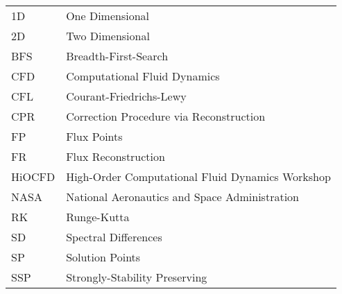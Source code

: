 \begin{longtable}{ll}
1D & One Dimensional \\
2D & Two Dimensional \\
BFS & Breadth-First-Search \\
CFD & Computational Fluid Dynamics \\
CFL & Courant-Friedrichs-Lewy \\
CPR & Correction Procedure via Reconstruction \\
FP & Flux Points \\
FR & Flux Reconstruction \\
HiOCFD & High-Order Computational Fluid Dynamics Workshop \\
NASA & National Aeronautics and Space Administration \\
RK & Runge-Kutta \\
SD & Spectral Differences \\
SP & Solution Points \\
SSP & Strongly-Stability Preserving \\
\end{longtable}

